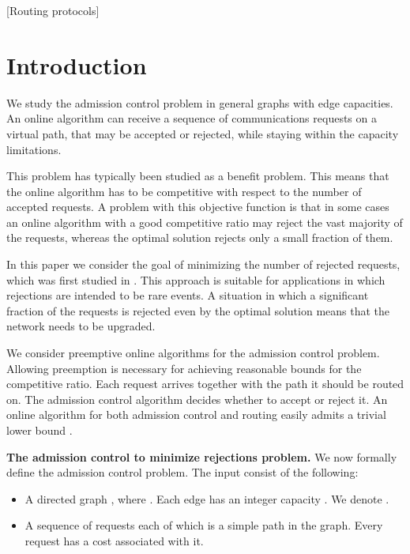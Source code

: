 \documentclass{sig-alternate}
\begin{document}
[Routing protocols] 





\section{Introduction}\label{sec:intro}

We study the admission control problem in general graphs with edge
capacities. An online algorithm can receive a sequence of
communications requests on a virtual path, that may be accepted or
rejected, while staying within the capacity limitations.

This problem has typically been studied as a benefit problem. This
means that the online algorithm has to be competitive with respect
to the number of accepted requests. A problem with this objective
function is that in some cases an online algorithm with a good
competitive ratio may reject the vast majority of the requests,
whereas the optimal solution rejects only a small fraction of
them.

In this paper we consider the goal of minimizing the number of
rejected requests, which was first studied in \cite{BlKaKl01}.
This approach is suitable for applications in which rejections are
intended to be rare events. A situation in which a significant
fraction of the requests is rejected even by the optimal solution
means that the network needs to be upgraded.

We consider preemptive online algorithms for the admission control
problem. Allowing preemption is necessary for achieving reasonable
bounds for the competitive ratio. Each request arrives together
with the path it should be routed on. The admission control
algorithm decides whether to accept or reject it. An online
algorithm for both admission control and routing easily admits a
trivial lower bound \cite{BlKaKl01}.

\textbf{The admission control to minimize rejections problem.} We
now formally define the admission control problem. The input
consist of the following:
\begin{itemize}
    \item A directed graph , where .
    Each edge  has an integer capacity .
    We denote .
    \item A sequence of requests  each of which is a simple path in the graph.
    Every request  has a cost  associated with it.
\end{itemize}
\end{document}
